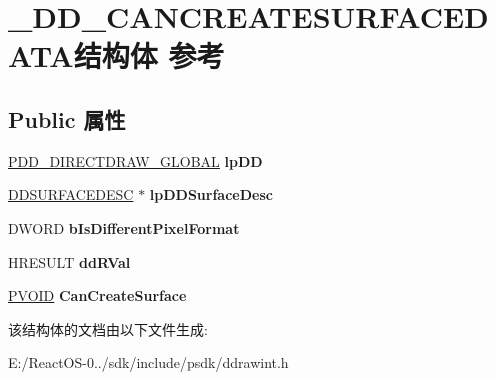 \hypertarget{struct___d_d___c_a_n_c_r_e_a_t_e_s_u_r_f_a_c_e_d_a_t_a}{}\section{\+\_\+\+D\+D\+\_\+\+C\+A\+N\+C\+R\+E\+A\+T\+E\+S\+U\+R\+F\+A\+C\+E\+D\+A\+T\+A结构体 参考}
\label{struct___d_d___c_a_n_c_r_e_a_t_e_s_u_r_f_a_c_e_d_a_t_a}
\subsection*{Public 属性}
\begin{DoxyCompactItemize}
\item 
\mbox{\label{struct___d_d___c_a_n_c_r_e_a_t_e_s_u_r_f_a_c_e_d_a_t_a_ac939acba0b6f29a4de00140e7f730de0}} 
\hyperlink{struct___d_d___d_i_r_e_c_t_d_r_a_w___g_l_o_b_a_l}{P\+D\+D\+\_\+\+D\+I\+R\+E\+C\+T\+D\+R\+A\+W\+\_\+\+G\+L\+O\+B\+AL} {\bfseries lp\+DD}
\item 
\mbox{\label{struct___d_d___c_a_n_c_r_e_a_t_e_s_u_r_f_a_c_e_d_a_t_a_ad4b99be662307b9de741fe312dad4424}} 
\hyperlink{interfacevoid}{D\+D\+S\+U\+R\+F\+A\+C\+E\+D\+E\+SC} $\ast$ {\bfseries lp\+D\+D\+Surface\+Desc}
\item 
\mbox{\label{struct___d_d___c_a_n_c_r_e_a_t_e_s_u_r_f_a_c_e_d_a_t_a_acc1c4029ccf034baf84b48efa1eb09ba}} 
D\+W\+O\+RD {\bfseries b\+Is\+Different\+Pixel\+Format}
\item 
\mbox{\label{struct___d_d___c_a_n_c_r_e_a_t_e_s_u_r_f_a_c_e_d_a_t_a_a0a170708ce9f88d8654cd4d83b43e240}} 
H\+R\+E\+S\+U\+LT {\bfseries dd\+R\+Val}
\item 
\mbox{\label{struct___d_d___c_a_n_c_r_e_a_t_e_s_u_r_f_a_c_e_d_a_t_a_a46379e5f6e1269e00c74ca7ec3d9c705}} 
\hyperlink{interfacevoid}{P\+V\+O\+ID} {\bfseries Can\+Create\+Surface}
\end{DoxyCompactItemize}


该结构体的文档由以下文件生成\+:\begin{DoxyCompactItemize}
\item 
E\+:/\+React\+O\+S-\/0../sdk/include/psdk/ddrawint.\+h\end{DoxyCompactItemize}

